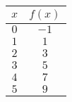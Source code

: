 \begin{tabular}{cc} \toprule
$x$  & $f(x)$ \\\midrule
$0$  & $-1$   \\
$1$  & $1$    \\
$2$  & $3$    \\
$3$  & $5$    \\
$4$  & $7$    \\
$5$  & $9$    \\\bottomrule
\end{tabular}
